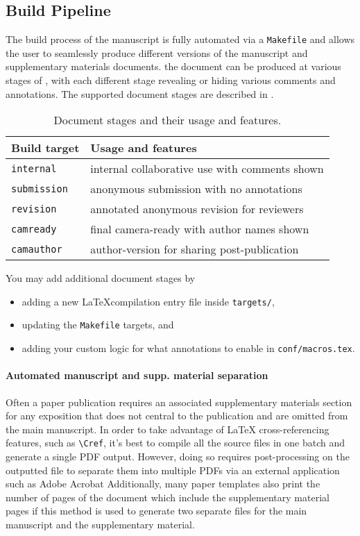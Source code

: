 \subsection{Build Pipeline}
\label{sec:howto:build-pipeline}

The build process of the manuscript is fully automated via a \texttt{Makefile} and allows the user to seamlessly produce different versions of the manuscript and supplementary materials documents.
\ie the document can be produced at various stages of , with each different stage revealing or hiding various comments and annotations.
The supported document stages are described in .
%
\begin{table}[ht]
    \caption{Document stages and their usage and features.}
    \label{tab:howto:doc-stages}
    \begin{tabular}{ll}
        \toprule
        Build target & Usage and features\\
        \midrule
        \texttt{internal} & internal collaborative use with comments shown\\
        \texttt{submission} & anonymous submission with no annotations\\
        \texttt{revision} & annotated anonymous revision for reviewers\\
        \texttt{camready} & final camera-ready with author names shown\\
        \texttt{camauthor} & author-version for sharing post-publication\\
        \bottomrule
    \end{tabular}
\end{table}

You may add additional document stages by
%
\begin{itemize}
    \item adding a new \LaTeX compilation entry file inside \texttt{targets/},
    \item updating the \texttt{Makefile} targets, and
    \item adding your custom logic for what annotations to enable in \texttt{conf/macros.tex}.
\end{itemize}

\paragraph{Automated manuscript and supp. material separation}
Often a paper publication requires an associated supplementary materials section for any exposition that does not central to the publication and are omitted from the main manuscript.
In order to take advantage of \LaTeX{} cross-referencing features, such as \texttt{\textbackslash Cref}, it's best to compile all the source files in one batch and generate a single PDF output.
However, doing so requires post-processing on the outputted file to separate them into multiple PDFs via an external application such as Adobe Acrobat \etc
Additionally, many paper templates also print the number of pages of the document which include the supplementary material pages if this method is used to generate two separate files for the main manuscript and the supplementary material.

